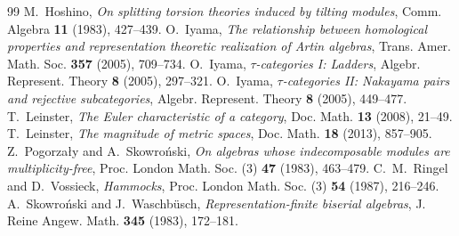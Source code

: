 \documentclass[a4paper,reqno,10pt]{amsart}
\theoremstyle{definition}
\numberwithin{equation}{section}
\begin{document}
\begin{thebibliography}{99}
M.~Hoshino,
\emph{On splitting torsion theories induced by tilting modules},
Comm. Algebra \textbf{11} (1983), 427--439.
O.~Iyama,
\emph{The relationship between homological properties and representation
theoretic realization of Artin algebras},
Trans. Amer. Math. Soc. \textbf{357} (2005), 709--734.
O.~Iyama,
\emph{\(\tau\)-categories I: Ladders},
Algebr. Represent. Theory \textbf{8} (2005), 297--321.
O.~Iyama,
\emph{\(\tau\)-categories II: Nakayama pairs and rejective subcategories},
Algebr. Represent. Theory \textbf{8} (2005), 449--477.
T.~Leinster,
\emph{The Euler characteristic of a category},
Doc. Math. \textbf{13} (2008), 21--49.
T.~Leinster,
\emph{The magnitude of metric spaces},
Doc. Math. \textbf{18} (2013), 857--905.
Z.~Pogorza{\l}y and A.~Skowro\'nski,
\emph{On algebras whose indecomposable modules are multiplicity-free},
Proc. London Math. Soc. (3) \textbf{47} (1983), 463--479.
C.~M.~Ringel and D.~Vossieck,
\emph{Hammocks},
Proc. London Math. Soc. (3) \textbf{54} (1987), 216--246.
A.~Skowro\'nski and J.~Waschb\"usch,
\emph{Representation-finite biserial algebras},
J. Reine Angew. Math. \textbf{345} (1983), 172--181.
\end{thebibliography}
\end{document}
